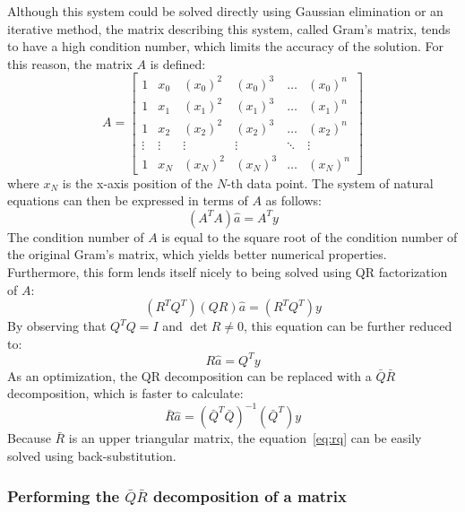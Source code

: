 \documentclass{article}
\begin{document}
	Although this system could be solved directly using Gaussian elimination
	or an iterative method, the matrix describing this system, called Gram's
	matrix, tends to have a high condition number, which limits the accuracy
	of the solution. For this reason, the matrix $A$ is defined:
	\begin{equation}
		A = \begin{bmatrix}
			1 & x_0 & (x_0)^2 & (x_0)^3 & \dots & (x_0)^n \\
			1 & x_1 & (x_1)^2 & (x_1)^3 & \dots & (x_1)^n \\
			1 & x_2 & (x_2)^2 & (x_2)^3 & \dots & (x_2)^n \\
			\vdots & \vdots & \vdots & \vdots & \ddots & \vdots \\
			1 & x_N & (x_N)^2 & (x_N)^3 & \dots & (x_N)^n
		\end{bmatrix}
	\end{equation}
	where $x_N$ is the x-axis position of the $N$-th data point. The system
	of natural equations can then be expressed in terms of $A$ as follows:
	\begin{equation}
		(A^TA)\widehat{a} = A^Ty
	\end{equation}
	The condition number of $A$ is equal to the square root of the condition
	number of the original Gram's matrix, which yields better numerical
	properties. Furthermore, this form lends itself nicely to being solved
	using QR factorization of $A$:
	\begin{equation}
		(R^TQ^T)(QR)\widehat{a} = (R^TQ^T)y
	\end{equation}
	By observing that $Q^TQ = I$ and $\det{R} \neq 0$, this equation can be
	further reduced to:
	\begin{equation}
		R\widehat{a} = Q^Ty
	\end{equation}
	As an optimization, the QR decomposition can be replaced with a $\bar{Q}
	\bar{R}$ decomposition, which is faster to calculate:
	\begin{equation}
		\bar{R}\widehat{a} = (\bar{Q}^T\bar{Q})^{-1}(\bar{Q}^T)y
		\label{eq:rq}
	\end{equation}
	Because $\bar{R}$ is an upper triangular matrix, the equation~\ref{eq:rq} can
	be easily solved using back-substitution.
	
	\subsubsection{Performing the $\bar{Q}\bar{R}$ decomposition of a
	matrix}
	
\end{document}
